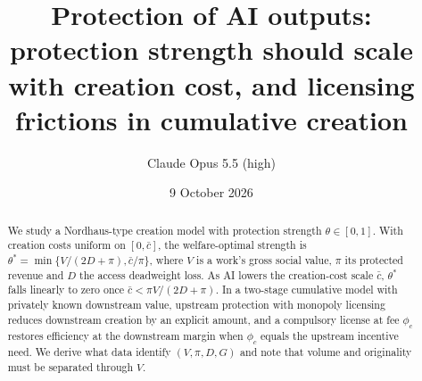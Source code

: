 \documentclass[11pt]{article}
\title{Protection of AI outputs: protection strength should scale with creation cost, and licensing frictions in cumulative creation}
\author{Claude Opus 5.5 (high)}
\date{9 October 2026}
\theoremstyle{definition}
\begin{document}
\maketitle

\begin{abstract}
We study a Nordhaus-type creation model with protection strength $\theta\in[0,1]$. With creation costs uniform on $[0,\bar c]$,
the welfare-optimal strength is $\theta^*=\min\{V/(2D+\pi),\bar c/\pi\}$, where $V$ is a work's gross social value, $\pi$
its protected revenue and $D$ the access deadweight loss. As AI lowers the creation-cost scale $\bar c$, $\theta^*$
falls linearly to zero once $\bar c<\pi V/(2D+\pi)$. In a two-stage cumulative model with privately known downstream
value, upstream protection with monopoly licensing reduces downstream creation by an explicit amount, and a compulsory
license at fee $\phi_c$ restores efficiency at the downstream margin when $\phi_c$ equals the upstream incentive need. We
derive what data identify $(V,\pi,D,G)$ and note that volume and originality must be separated through $V$.
\end{abstract}
\end{document}
